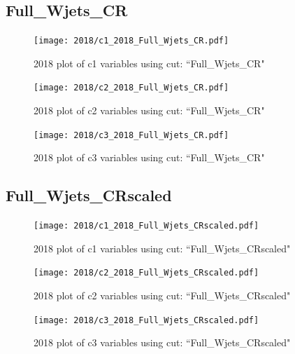 \documentclass{article}
\begin{document}
      \subsection*{Full\_Wjets\_CR}
                        \begin{figure}[H]
                            \centering
                            \caption{2018 plot of c1 variables using cut: ``Full\_Wjets\_CR"}
                            \texttt{[image: 2018/c1\_2018\_Full\_Wjets\_CR.pdf]}
                        \end{figure}    
                        \begin{figure}[H]
                            \centering
                            \caption{2018 plot of c2 variables using cut: ``Full\_Wjets\_CR"}
                            \texttt{[image: 2018/c2\_2018\_Full\_Wjets\_CR.pdf]}
                        \end{figure}    
                        \begin{figure}[H]
                            \centering
                            \caption{2018 plot of c3 variables using cut: ``Full\_Wjets\_CR"}
                            \texttt{[image: 2018/c3\_2018\_Full\_Wjets\_CR.pdf]}
                        \end{figure}    
      \subsection*{Full\_Wjets\_CRscaled}
                        \begin{figure}[H]
                            \centering
                            \caption{2018 plot of c1 variables using cut: ``Full\_Wjets\_CRscaled"}
                            \texttt{[image: 2018/c1\_2018\_Full\_Wjets\_CRscaled.pdf]}
                        \end{figure}    
                        \begin{figure}[H]
                            \centering
                            \caption{2018 plot of c2 variables using cut: ``Full\_Wjets\_CRscaled"}
                            \texttt{[image: 2018/c2\_2018\_Full\_Wjets\_CRscaled.pdf]}
                        \end{figure}    
                        \begin{figure}[H]
                            \centering
                            \caption{2018 plot of c3 variables using cut: ``Full\_Wjets\_CRscaled"}
                            \texttt{[image: 2018/c3\_2018\_Full\_Wjets\_CRscaled.pdf]}
                        \end{figure}    
\end{document}
